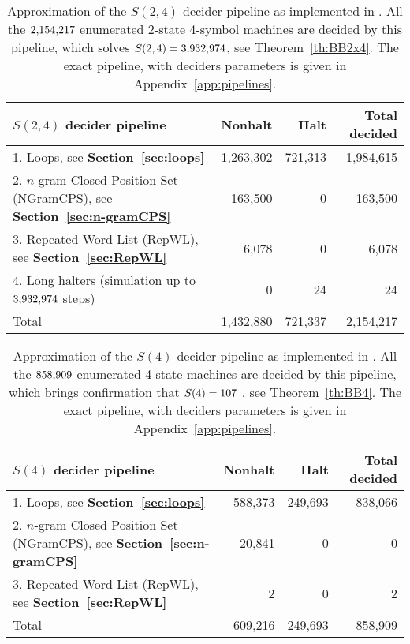 \begin{table}[h!]
    \centering
    \begin{tabular}{|l|rrr|}
        \hline
        $S(2,4)$ decider pipeline                                                            & Nonhalt   & Halt    & Total decided \\
        \hline
        1. Loops, see \textbf{Section~\ref{sec:loops}}                                       & 1,263,302 & 721,313 & 1,984,615     \\
        2. $n$-gram Closed Position Set (NGramCPS), see \textbf{Section~\ref{sec:n-gramCPS}} & 163,500   & 0       & 163,500       \\
        3. Repeated Word List (RepWL), see \textbf{Section~\ref{sec:RepWL}}                  & 6,078     & 0       & 6,078         \\
        4. Long halters (simulation up to $3{,}932{,}974$ steps)                                    & 0         & 24      & 24            \\
        \hline
        Total                                                                                & 1,432,880 & 721,337 & 2,154,217     \\ \hline
    \end{tabular}
    \caption{Approximation of the $S(2,4)$ decider pipeline as implemented in \CoqBB. All the $2{,}154{,}217$ enumerated 2-state 4-symbol machines are decided by this pipeline, which solves $S(2,4) = 3{,}932{,}974$, see Theorem~\ref{th:BB2x4}. The exact pipeline, with deciders parameters is given in Appendix~\ref{app:pipelines}. }\label{tab:pipelineBB2x4}
\end{table}

\begin{table}[h!]
    \centering
    \begin{tabular}{|l|rrr|}
        \hline
        $S(4)$ decider pipeline                                                              & Nonhalt & Halt    & Total decided \\
        \hline
        1. Loops, see \textbf{Section~\ref{sec:loops}}                                       & 588,373 & 249,693 & 838,066       \\
        2. $n$-gram Closed Position Set (NGramCPS), see \textbf{Section~\ref{sec:n-gramCPS}} & 20,841  & 0       & 0             \\
        3. Repeated Word List (RepWL), see \textbf{Section~\ref{sec:RepWL}}                  & 2       & 0       & 2             \\
        \hline
        Total                                                                                & 609,216 & 249,693 & 858,909       \\
        \hline
    \end{tabular}
    \caption{Approximation of the $S(4)$ decider pipeline as implemented in \CoqBB. All the $858{,}909$ enumerated 4-state machines are decided by this pipeline, which brings confirmation that $S(4) = 107$ \cite{Brady83}, see Theorem~\ref{th:BB4}. The exact pipeline, with deciders parameters is given in Appendix~\ref{app:pipelines}. }\label{tab:pipelineBB4}
\end{table}

